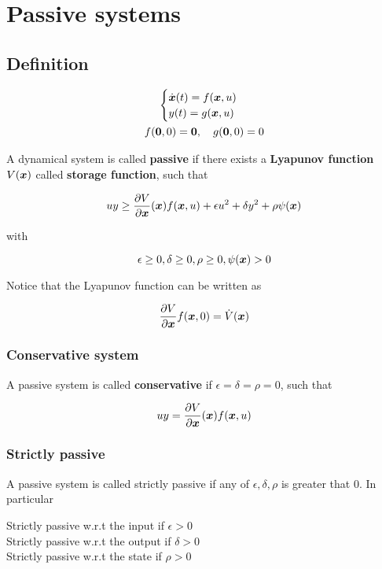 \chapter{Passive systems}

\section{Definition}

\begin{gather*}
    \begin{cases}
        \dot{\boldsymbol{x}} (t) = f(\boldsymbol{x},u) \\
        y(t) = g(\boldsymbol{x},u)
    \end{cases} \\
    f(\boldsymbol{0},0) = \boldsymbol{0}, \quad g(\boldsymbol{0},0)=0
\end{gather*}

A dynamical system is called \textbf{passive} if there exists a \textbf{Lyapunov function} $V(\boldsymbol{x})$ called \textbf{storage function}, such that

\[
    uy \geq \frac{\partial V}{\partial \boldsymbol{x}}(\boldsymbol{x}) f(\boldsymbol{x},u) + \epsilon u^2 + \delta y^2 + \rho \psi(\boldsymbol{x})
\]

with

\[
    \epsilon \geq 0, \delta \geq 0, \rho \geq 0, \psi(\boldsymbol{x}) > 0
\]

Notice that the Lyapunov function can be written as

\[
     \frac{\partial V}{\partial \boldsymbol{x}} f(\boldsymbol{x},0) = \dot{V}(\boldsymbol{x})
\]

\subsection{Conservative system}

A passive system is called \textbf{conservative} if $\epsilon = \delta = \rho = 0$, such that

\[
    uy = \frac{\partial V}{\partial \boldsymbol{x}}(\boldsymbol{x}) f(\boldsymbol{x},u)
\]

\subsection{Strictly passive}

A passive system is called strictly passive if any of $\epsilon, \delta, \rho$ is greater that $0$.
In particular

Strictly passive w.r.t the input if $\epsilon > 0$ \\
Strictly passive w.r.t the output if $\delta > 0$ \\
Strictly passive w.r.t the state if $\rho > 0$

